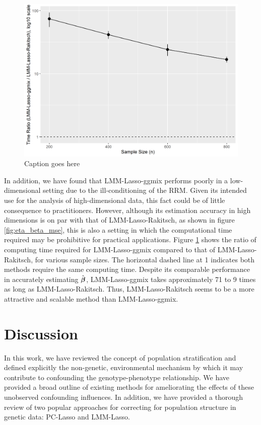 \begin{figure}[H]
    \centering
    \includegraphics[scale = 0.8]{figures/time_ratio.png}
    \caption{Caption goes here }
    \label{fig:time}
\end{figure}


In addition, we have found that LMM-Lasso-ggmix performs poorly in a low-dimensional setting due to the ill-conditioning of the RRM. Given its intended use for the analysis of high-dimensional data, this fact could be of little consequence to practitioners. However, although its estimation accuracy in high dimensions is on par with that of LMM-Lasso-Rakitsch, as shown in figure \ref{fig:eta_beta_mse}, this is also a setting in which the computational time required may be prohibitive for practical applications. Figure \ref{fig:time} shows the ratio of computing time required for LMM-Lasso-ggmix compared to that of LMM-Lasso-Rakitsch, for various sample sizes. The horizontal dashed line at 1 indicates both methods require the same computing time. Despite its comparable performance in accurately estimating $\hat{\boldsymbol{\beta}}$, LMM-Lasso-ggmix takes approximately 71 to 9 times as long as LMM-Lasso-Rakitsch. Thus, LMM-Lasso-Rakitsch seems to be a more attractive and scalable method than LMM-Lasso-ggmix.


\section{Discussion} \label{sec:discussion}
In this work, we have reviewed the concept of population stratification and defined explicitly the non-genetic, environmental mechanism by which it may contribute to confounding the genotype-phenotype relationship. We have provided a broad outline of existing methods for ameliorating the effects of these unobserved confounding influences. In addition, we have provided a thorough review of two popular approaches for correcting for population structure in genetic data: PC-Lasso and LMM-Lasso. 

